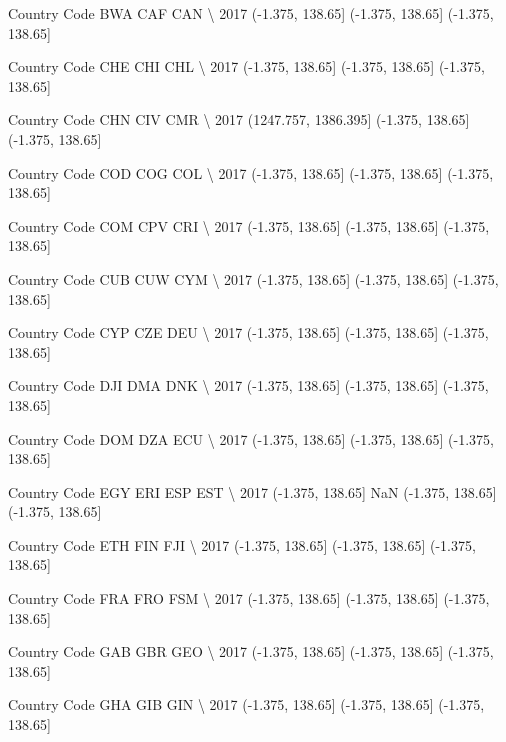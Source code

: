 \documentclass[11pt]{article}
\begin{document}
Country Code               BWA               CAF               CAN  \textbackslash{}
2017          (-1.375, 138.65]  (-1.375, 138.65]  (-1.375, 138.65]   

Country Code               CHE               CHI               CHL  \textbackslash{}
2017          (-1.375, 138.65]  (-1.375, 138.65]  (-1.375, 138.65]   

Country Code                   CHN               CIV               CMR  \textbackslash{}
2017          (1247.757, 1386.395]  (-1.375, 138.65]  (-1.375, 138.65]   

Country Code               COD               COG               COL  \textbackslash{}
2017          (-1.375, 138.65]  (-1.375, 138.65]  (-1.375, 138.65]   

Country Code               COM               CPV               CRI  \textbackslash{}
2017          (-1.375, 138.65]  (-1.375, 138.65]  (-1.375, 138.65]   

Country Code               CUB               CUW               CYM  \textbackslash{}
2017          (-1.375, 138.65]  (-1.375, 138.65]  (-1.375, 138.65]   

Country Code               CYP               CZE               DEU  \textbackslash{}
2017          (-1.375, 138.65]  (-1.375, 138.65]  (-1.375, 138.65]   

Country Code               DJI               DMA               DNK  \textbackslash{}
2017          (-1.375, 138.65]  (-1.375, 138.65]  (-1.375, 138.65]   

Country Code               DOM               DZA               ECU  \textbackslash{}
2017          (-1.375, 138.65]  (-1.375, 138.65]  (-1.375, 138.65]   

Country Code               EGY  ERI               ESP               EST  \textbackslash{}
2017          (-1.375, 138.65]  NaN  (-1.375, 138.65]  (-1.375, 138.65]   

Country Code               ETH               FIN               FJI  \textbackslash{}
2017          (-1.375, 138.65]  (-1.375, 138.65]  (-1.375, 138.65]   

Country Code               FRA               FRO               FSM  \textbackslash{}
2017          (-1.375, 138.65]  (-1.375, 138.65]  (-1.375, 138.65]   

Country Code               GAB               GBR               GEO  \textbackslash{}
2017          (-1.375, 138.65]  (-1.375, 138.65]  (-1.375, 138.65]   

Country Code               GHA               GIB               GIN  \textbackslash{}
2017          (-1.375, 138.65]  (-1.375, 138.65]  (-1.375, 138.65]   
\end{document}

